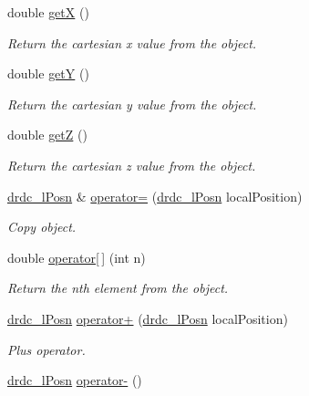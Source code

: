 \begin{CompactItemize}
double \hyperlink{classdrdc__lPosn_24bd2d1abe31b04ddf3429436437928f}{getX} ()
\begin{CompactList}\small\item\em Return the cartesian x value from the object. \item\end{CompactList}\item 
double \hyperlink{classdrdc__lPosn_3a7718f613111be6ad5416d0d647e69b}{getY} ()
\begin{CompactList}\small\item\em Return the cartesian y value from the object. \item\end{CompactList}\item 
double \hyperlink{classdrdc__lPosn_5fd391c6678362dc39b851595e9dfad0}{getZ} ()
\begin{CompactList}\small\item\em Return the cartesian z value from the object. \item\end{CompactList}\item 
\hyperlink{classdrdc__lPosn}{drdc\_\-lPosn} \& \hyperlink{classdrdc__lPosn_b69846826c38c374214c63391e208fa6}{operator=} (\hyperlink{classdrdc__lPosn}{drdc\_\-lPosn} localPosition)
\begin{CompactList}\small\item\em Copy object. \item\end{CompactList}\item 
double \hyperlink{classdrdc__lPosn_560e0df0460811efbcecc0817f62bc64}{operator\mbox{[}$\,$\mbox{]}} (int n)
\begin{CompactList}\small\item\em Return the nth element from the object. \item\end{CompactList}\item 
\hyperlink{classdrdc__lPosn}{drdc\_\-lPosn} \hyperlink{classdrdc__lPosn_544e6d8a1487af369ea8846864e11935}{operator+} (\hyperlink{classdrdc__lPosn}{drdc\_\-lPosn} localPosition)
\begin{CompactList}\small\item\em Plus operator. \item\end{CompactList}\item 
\hyperlink{classdrdc__lPosn}{drdc\_\-lPosn} \hyperlink{classdrdc__lPosn_3d1a980f8ae3cc19e7f30cd29daeab46}{operator-} ()

\end{CompactItemize}
